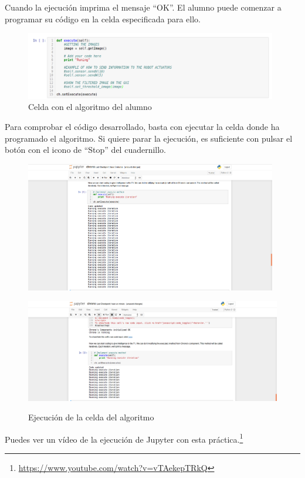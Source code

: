 Cuando la ejecución imprima el mensaje ``OK''. El alumno puede comenzar a programar su código en la celda especificada para ello.

\begin{figure}[H]
  \begin{center}
    \includegraphics[width=0.98\textwidth]{figures/celda_solucion_chrono.png}
		\caption{Celda con el algoritmo del alumno}
		\label{fig.ccach}
		\end{center}
\end{figure}

Para comprobar el código desarrollado, basta con ejecutar la celda donde ha programado el algoritmo. Si quiere parar la ejecución, es suficiente con pulsar el botón con el icono de ``Stop'' del cuadernillo.

\begin{figure}[H]
    \centering
	\begin{minipage}[h]{.48\linewidth}
    \centering
    \includegraphics[width=0.98\textwidth]{figures/ejecucion_chrono_jupyter.png}
		\caption{Ejecución de la celda del algoritmo}
		\label{fig.ecj}
	 \end{minipage}
    \begin{minipage}[h]{.48\linewidth}
    \centering
    \includegraphics[width=0.98\linewidth]{figures/stop_chrono_jupyter.png}
		\label{fig:scj}
	\end{minipage}
\end{figure}

Puedes ver un vídeo de la ejecución de Jupyter con esta práctica.\footnote{\url{https://www.youtube.com/watch?v=vTAekepTRkQ}}